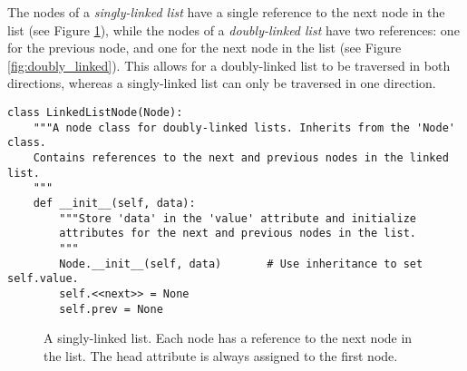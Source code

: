 The nodes of a \emph{singly-linked list} have a single reference to the next node in the list (see Figure \ref{fig:singly_linked}), while the nodes of a \emph{doubly-linked list} have two references: one for the previous node, and one for the next node in the list (see Figure \ref{fig:doubly_linked}).
This allows for a doubly-linked list to be traversed in both directions, whereas a singly-linked list can only be traversed in one direction.

\begin{lstlisting}
class LinkedListNode(Node):
    """A node class for doubly-linked lists. Inherits from the 'Node' class.
    Contains references to the next and previous nodes in the linked list.
    """
    def __init__(self, data):
        """Store 'data' in the 'value' attribute and initialize
        attributes for the next and previous nodes in the list.
        """
        Node.__init__(self, data)       # Use inheritance to set self.value.
        self.<<next>> = None
        self.prev = None
\end{lstlisting}

\begin{figure} %
\centering
{}
\caption{A singly-linked list. Each node has a reference to the next node in the list. The head attribute is always assigned to the first node.}
\label{fig:singly_linked}
\end{figure}

